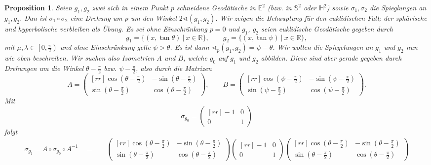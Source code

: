 \documentclass[11pt]{book}
\numberwithin{dummy}{section}
\newtheorem{proposition}[theorem]{Proposition}
\theoremstyle{nonumberbreak}
\newenvironment{pr}[1][]{\ifthenelse{\equal{#1}{}}{\proof}{\proof[#1]}\rm}{\endproof}
\newcommand{\E}{\mathbb{E}}
\newcommand{\R}{\mathbb{R}}
\newcommand{\Sph}{\mathbb{S}}
\newcommand{\He}{\mathbb{H}}
\newcommand{\matx}[4]{\begin{pmatrix}[rr]#1 & #2 \\[-6pt] #3 & #4 \end{pmatrix}}
\begin{document}
\begin{spacing}{1.4}
\begin{proposition}
Seien $g_1, g_2$ zwei sich in einem Punkt $p$ schneidene Geodätische in $\E^2$ (bzw. in $\Sph^2$ oder $\He^2$) sowie $\sigma_1, \sigma_2$ die Spieglungen an $g_1, g_2$. Dan ist $\sigma_1 \circ \sigma_2$ eine Drehung um $p$ um den Winkel $2 \sphericalangle (g_1, g_2)$.
\begin{pr}
Wir zeigen die Behauptung für den euklidischen Fall; der sphärische und hyperbolische verbleiben als Übung. Es sei ohne Einschränkung $p=0$ und $g_1$, $g_2$ seien euklidische Geodätische gegeben durch 
$$g_1=\{(x, \tan \theta) \ \vert \ x \in \R\}, \qquad g_2=\{(x,\tan \psi) \ \vert \ x \in \R\},$$
mit $\mu, \lambda \in \left[0, \frac{\pi}{2}\right)$ und ohne Einschränkung gelte $\psi> \theta$. Es ist dann $\sphericalangle_p(g_1,g_2) = \psi - \theta$. Wir wollen die Spiegelungen an $g_1$ und $g_2$ nun wie oben beschreiben. Wir suchen also Isometrien $A$ und $B$, welche $g_0$ auf $g_1$ und $g_2$ abbilden. Diese sind aber gerade gegeben durch Drehungen um die Winkel $\theta - \frac{\pi}{2}$ bzw. $\psi - \frac{\pi}{2}$, also durch die Matrizen
$$A=\begin{pmatrix}[rr] \cos\left( \theta - \frac{\pi}{2} \right)& - \sin\left( \theta - \frac{\pi}{2}\right) \\ \sin \left(\theta - \frac{\pi}{2}\right) & \cos\left( \theta - \frac{\pi}{2} \right)\end{pmatrix}, \qquad B=\begin{pmatrix}[rr] \cos\left( \psi - \frac{\pi}{2} \right)& - \sin\left( \psi - \frac{\pi}{2}\right) \\ \sin \left(\psi - \frac{\pi}{2}\right) & \cos\left( \psi - \frac{\pi}{2} \right)\end{pmatrix}.$$
Mit
$$\sigma_{g_0}=\matx{-1}{0}{0}{1}$$
folgt
\begin{alignat*}{5}
\sigma_{g_1} =  A \circ \sigma_{g_0} \circ A^{-1} \ \ &=&& \ \ \begin{pmatrix}[rr] \cos\left( \theta - \frac{\pi}{2} \right)& - \sin\left( \theta - \frac{\pi}{2}\right) \\ \sin \left(\theta - \frac{\pi}{2}\right) & \cos\left( \theta - \frac{\pi}{2} \right)\end{pmatrix} \matx{-1}{0}{0}{1} \begin{pmatrix}[rr] \cos\left( \theta - \frac{\pi}{2} \right)& - \sin\left( \theta - \frac{\pi}{2}\right) \\ \sin \left(\theta - \frac{\pi}{2}\right) & \cos\left( \theta - \frac{\pi}{2} \right)\end{pmatrix} \\

\end{alignat*}
\end{pr}
\end{proposition}
\end{spacing}
\end{document}
